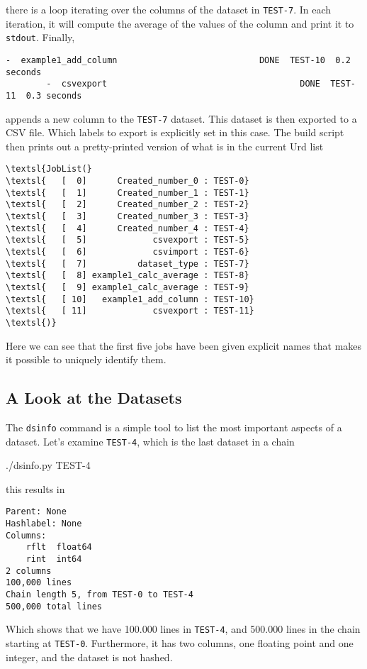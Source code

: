 \documentclass[a4paper]{article}
\begin{document}
\noindent there is a loop iterating over the columns of the dataset in
\texttt{TEST-7}.  In each iteration, it will compute the average of
the values of the column and print it to \texttt{stdout}.  Finally,
\begin{snugshade}
\begin{Verbatim}[commandchars=\\\{\}]
        -  example1_add_column                            DONE  TEST-10  0.2 seconds
        -  csvexport                                      DONE  TEST-11  0.3 seconds
\end{Verbatim}
\end{snugshade}
\noindent appends a new column to the \texttt{TEST-7} dataset.  This
dataset is then exported to a CSV file.  Which labels to export is
explicitly set in this case.  The build script then prints out a
pretty-printed version of what is in the current Urd list
\begin{snugshade}
\begin{Verbatim}[commandchars=\\\{\}]
\textsl{JobList(}
\textsl{   [  0]      Created_number_0 : TEST-0}
\textsl{   [  1]      Created_number_1 : TEST-1}
\textsl{   [  2]      Created_number_2 : TEST-2}
\textsl{   [  3]      Created_number_3 : TEST-3}
\textsl{   [  4]      Created_number_4 : TEST-4}
\textsl{   [  5]             csvexport : TEST-5}
\textsl{   [  6]             csvimport : TEST-6}
\textsl{   [  7]          dataset_type : TEST-7}
\textsl{   [  8] example1_calc_average : TEST-8}
\textsl{   [  9] example1_calc_average : TEST-9}
\textsl{   [ 10]   example1_add_column : TEST-10}
\textsl{   [ 11]             csvexport : TEST-11}
\textsl{)}
\end{Verbatim}
\end{snugshade}
\noindent Here we can see that the first five jobs have been given
explicit names that makes it possible to uniquely identify them.



\subsection*{A Look at the Datasets}
The \texttt{dsinfo} command is a simple tool to list the most
important aspects of a dataset.  Let's examine \texttt{TEST-4}, which
is the last dataset in a chain
\begin{shell2}
./dsinfo.py TEST-4
\end{shell2}
this results in
\begin{snugshade}
\begin{Verbatim}[commandchars=\\\{\}]
Parent: None
Hashlabel: None
Columns:
    rflt  float64
    rint  int64
2 columns
100,000 lines
Chain length 5, from TEST-0 to TEST-4
500,000 total lines
\end{Verbatim}
\end{snugshade}
Which shows that we have 100.000 lines in \texttt{TEST-4}, and 500.000
lines in the chain starting at \texttt{TEST-0}.  Furthermore, it has
two columns, one floating point and one integer, and the dataset is
not hashed.
\end{document}
